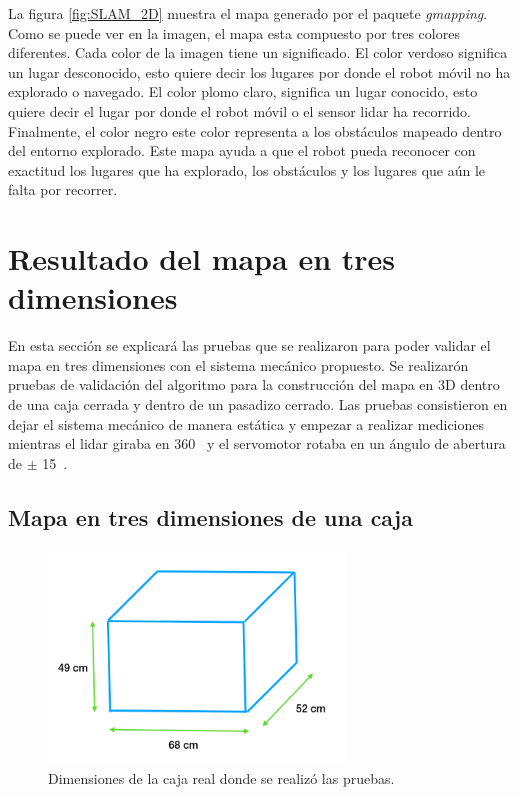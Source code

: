 La figura \ref{fig:SLAM_2D} muestra el mapa generado por el paquete \textit{gmapping}. Como 
se puede ver en la imagen, el mapa esta compuesto por tres colores diferentes. Cada color 
de la imagen tiene un significado. El color verdoso significa un lugar desconocido, esto 
quiere decir los lugares por donde el robot móvil no ha explorado o navegado. El color 
plomo claro, significa un lugar conocido, esto quiere decir el lugar por donde el robot 
móvil o el sensor lidar ha recorrido. Finalmente, el color negro este color representa a 
los obstáculos mapeado dentro del entorno explorado. Este mapa ayuda a que el robot pueda 
reconocer con exactitud los lugares que ha explorado, los obstáculos y los lugares que aún 
le falta por recorrer.

\section{Resultado del mapa en tres dimensiones}
En esta sección se explicará las pruebas que se realizaron para poder validar el mapa en 
tres dimensiones con el sistema mecánico propuesto. Se realizarón pruebas de validación 
del algoritmo para la construcción del mapa en 3D dentro de una caja cerrada y dentro de 
un pasadizo cerrado. Las pruebas consistieron en dejar el sistema mecánico de manera 
estática y empezar a realizar mediciones mientras el lidar giraba en 360\grad~ y el 
servomotor rotaba en un ángulo de abertura de $\pm$ 15\grad~.

\subsection{Mapa en tres dimensiones de una caja}
\begin{figure}
  \centering \footnotesize
  \includegraphics[width=0.70\textwidth]{images/dimensiones_caja.png}
  \captionsetup{font=footnotesize}
  \caption{Dimensiones de la caja real donde se realizó las pruebas.}
  \label{fig:dim_cajaReal}
\end{figure}

